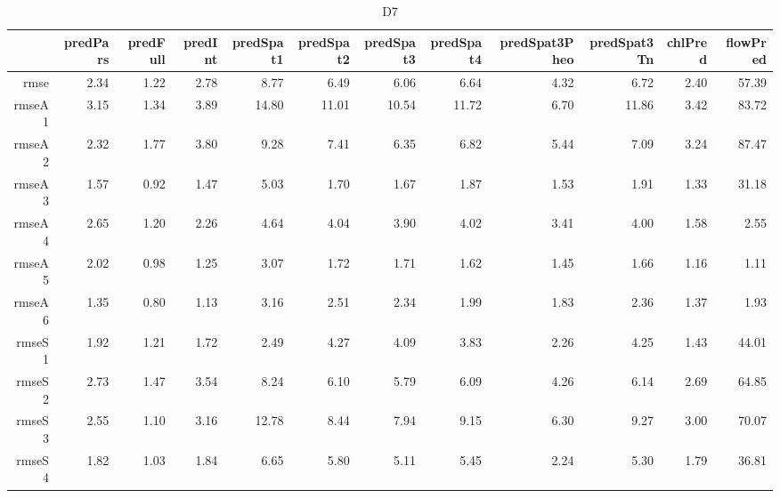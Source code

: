 \begin{table}[H]
\centering
\begingroup\fontsize{2.5pt}{4pt}\selectfont
\begin{tabular}{rrrrrrrrrrrr}
  \hline
 & predPars & predFull & predInt & predSpat1 & predSpat2 & predSpat3 & predSpat4 & predSpat3Pheo & predSpat3Tn & chlPred & flowPred \\ 
  \hline
rmse & 2.34 & 1.22 & 2.78 & 8.77 & 6.49 & 6.06 & 6.64 & 4.32 & 6.72 & 2.40 & 57.39 \\ 
  rmseA1 & 3.15 & 1.34 & 3.89 & 14.80 & 11.01 & 10.54 & 11.72 & 6.70 & 11.86 & 3.42 & 83.72 \\ 
  rmseA2 & 2.32 & 1.77 & 3.80 & 9.28 & 7.41 & 6.35 & 6.82 & 5.44 & 7.09 & 3.24 & 87.47 \\ 
  rmseA3 & 1.57 & 0.92 & 1.47 & 5.03 & 1.70 & 1.67 & 1.87 & 1.53 & 1.91 & 1.33 & 31.18 \\ 
  rmseA4 & 2.65 & 1.20 & 2.26 & 4.64 & 4.04 & 3.90 & 4.02 & 3.41 & 4.00 & 1.58 & 2.55 \\ 
  rmseA5 & 2.02 & 0.98 & 1.25 & 3.07 & 1.72 & 1.71 & 1.62 & 1.45 & 1.66 & 1.16 & 1.11 \\ 
  rmseA6 & 1.35 & 0.80 & 1.13 & 3.16 & 2.51 & 2.34 & 1.99 & 1.83 & 2.36 & 1.37 & 1.93 \\ 
  rmseS1 & 1.92 & 1.21 & 1.72 & 2.49 & 4.27 & 4.09 & 3.83 & 2.26 & 4.25 & 1.43 & 44.01 \\ 
  rmseS2 & 2.73 & 1.47 & 3.54 & 8.24 & 6.10 & 5.79 & 6.09 & 4.26 & 6.14 & 2.69 & 64.85 \\ 
  rmseS3 & 2.55 & 1.10 & 3.16 & 12.78 & 8.44 & 7.94 & 9.15 & 6.30 & 9.27 & 3.00 & 70.07 \\ 
  rmseS4 & 1.82 & 1.03 & 1.84 & 6.65 & 5.80 & 5.11 & 5.45 & 2.24 & 5.30 & 1.79 & 36.81 \\ 
   \hline
\end{tabular}
\endgroup
\caption{D7} 
\end{table}
